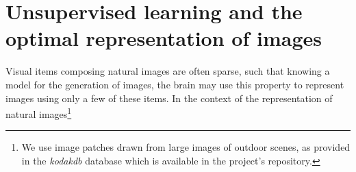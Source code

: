 \documentclass[vision,article,submit,oneauthor,pdftex]{Definitions/mdpi}
\newcommand{\coef}{\mathbf{a}} %
\newcommand{\image}{\mathbf{y}} %
\newcommand{\dico}{\Phi} %
\newcommand{\eqdef}{\ensuremath{\stackrel{\mbox{\upshape\tiny def.}}{=}}}
\newcommand{\RR}{\mathbb{R}}
\begin{document}
\section{Unsupervised learning and the optimal representation of images}%
%
%
%
Visual items composing natural images are often sparse, such that knowing a model for the generation of images, the brain may use this property to represent images using only a few of these items.
In the context of the representation of natural images\footnote{We use image patches drawn from large images of outdoor scenes, as provided in the \emph{kodakdb} database which is available in the project's repository. %
}
\end{document}
